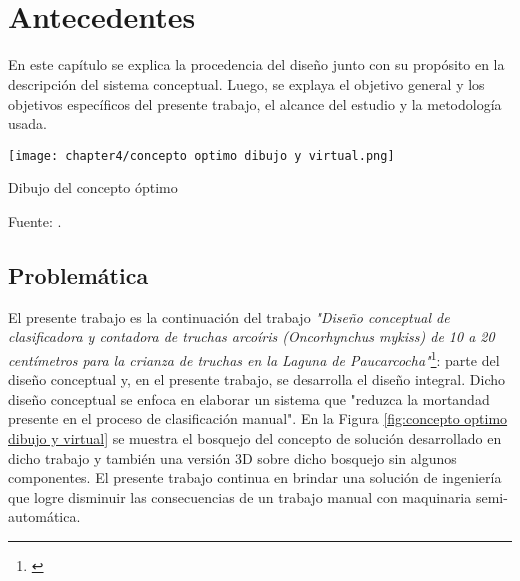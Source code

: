 
\pagestyle{myportland}
\doublespacing
\chapter[\quad\quad\quad\quad ----- Antecedentes]{\\Antecedentes}
\thispagestyle{myportland}

En este capítulo se explica la procedencia del diseño junto con su propósito en la descripción del sistema conceptual. Luego, se explaya el objetivo general y los objetivos específicos del presente trabajo, el alcance del estudio y la metodología usada.


\begin{myfigure}[H]
	\centering
	\texttt{[image: chapter4/concepto optimo dibujo y virtual.png]}
	\caption{Dibujo del concepto óptimo}
	\begin{myflushcenter}
		Fuente: \cite{DiazVergara2020}.
	\end{myflushcenter}
	\label{fig:concepto optimo dibujo y virtual}
\end{myfigure}

\section{Problemática}

El presente trabajo es la continuación del trabajo \textit{"Diseño conceptual de clasificadora y contadora de truchas arcoíris (Oncorhynchus mykiss) de 10 a 20 centímetros para la crianza de truchas en la Laguna de Paucarcocha"}\footnote{\cite{DiazVergara2020}}: parte del diseño conceptual y, en el presente trabajo, se desarrolla el diseño integral. Dicho diseño conceptual se enfoca en elaborar un sistema que "reduzca la mortandad presente en el proceso de clasificación manual". En la Figura \ref{fig:concepto optimo dibujo y virtual} se muestra el bosquejo del concepto de solución desarrollado en dicho trabajo y también una versión 3D sobre dicho bosquejo sin algunos componentes. El presente trabajo continua en brindar una solución de ingeniería que logre disminuir las consecuencias de un trabajo manual con maquinaria semi-automática.


